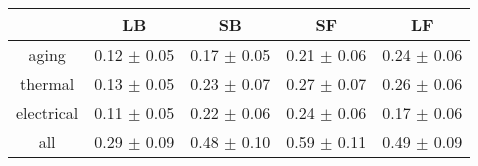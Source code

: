 \begin{tabular}{c c c c c }
\hline
 & LB & SB & SF & LF \\
\hline
aging & 0.12 $\pm$ 0.05 & 0.17 $\pm$ 0.05 & 0.21 $\pm$ 0.06 & 0.24 $\pm$ 0.06 \\
thermal & 0.13 $\pm$ 0.05 & 0.23 $\pm$ 0.07 & 0.27 $\pm$ 0.07 & 0.26 $\pm$ 0.06 \\
electrical & 0.11 $\pm$ 0.05 & 0.22 $\pm$ 0.06 & 0.24 $\pm$ 0.06 & 0.17 $\pm$ 0.06 \\
all & 0.29 $\pm$ 0.09 & 0.48 $\pm$ 0.10 & 0.59 $\pm$ 0.11 & 0.49 $\pm$ 0.09 \\
\hline
\end{tabular}